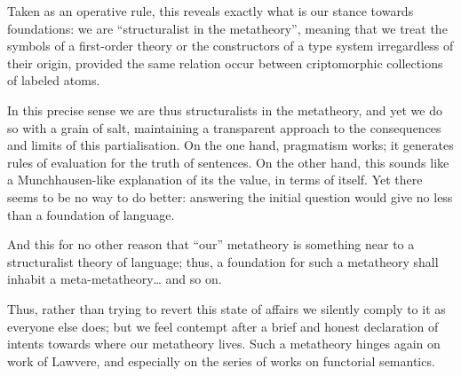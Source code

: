 \documentclass{amsart}
\begin{document}
Taken as an operative rule, this reveals exactly what is our stance towards foundations: we are ``structuralist in the metatheory'', meaning that we treat the symbols of a first-order theory or the constructors of a type system irregardless of their origin, provided the same relation occur between criptomorphic collections of labeled atoms.

In this precise sense we are thus structuralists in the metatheory, and yet we do so with a grain of salt, maintaining a transparent approach to the consequences and limits of this partialisation. On the one hand, pragmatism works; it generates rules of evaluation for the truth of sentences. On the other hand, this sounds like a Munchhausen-like explanation of its the value, in terms of itself. Yet there seems to be no way to do better: answering the initial question would give no less than a foundation of language.

And this for no other reason that ``our'' metatheory is something near to a structuralist theory of language; thus, a foundation for such a metatheory shall inhabit a meta-metatheory\dots{} and so on.

Thus, rather than trying to revert this state of affairs we silently comply to it as everyone else does; but we feel contempt after a brief and honest declaration of intents towards where our metatheory lives. Such a metatheory hinges again on work of Lawvere, and especially on the series of works on functorial semantics.
\end{document}
